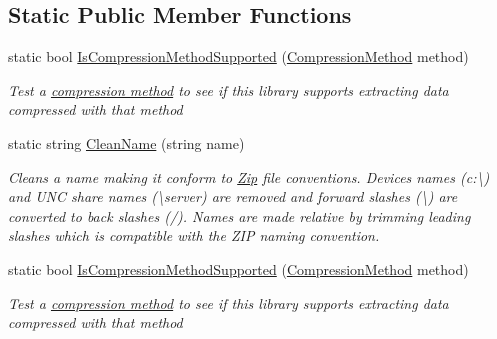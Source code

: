 \subsection*{Static Public Member Functions}
\begin{DoxyCompactItemize}
\item 
static bool \hyperlink{class_i_c_sharp_code_1_1_sharp_zip_lib_1_1_zip_1_1_zip_entry_ad464679f6e18df0d48a71dbc47fa1ac5}{Is\+Compression\+Method\+Supported} (\hyperlink{namespace_i_c_sharp_code_1_1_sharp_zip_lib_1_1_zip_a90a0e174eca72bf6b490bae40d83a09e}{Compression\+Method} method)
\begin{DoxyCompactList}\small\item\em Test a \hyperlink{class_i_c_sharp_code_1_1_sharp_zip_lib_1_1_zip_1_1_zip_entry_a1c4996433278e904adf2b5a6fe8718c0}{compression method} to see if this library supports extracting data compressed with that method \end{DoxyCompactList}\item 
static string \hyperlink{class_i_c_sharp_code_1_1_sharp_zip_lib_1_1_zip_1_1_zip_entry_a1eb0c6159ce91d0303ab617c109b6b0d}{Clean\+Name} (string name)
\begin{DoxyCompactList}\small\item\em Cleans a name making it conform to \hyperlink{namespace_i_c_sharp_code_1_1_sharp_zip_lib_1_1_zip}{Zip} file conventions. Devices names (\textquotesingle{}c\+:\textbackslash{}\textquotesingle{}) and U\+NC share names (\textquotesingle{}\textbackslash{}server\textquotesingle{}) are removed and forward slashes (\textquotesingle{}\textbackslash{}\textquotesingle{}) are converted to back slashes (\textquotesingle{}/\textquotesingle{}). Names are made relative by trimming leading slashes which is compatible with the Z\+IP naming convention. \end{DoxyCompactList}\item 
static bool \hyperlink{class_i_c_sharp_code_1_1_sharp_zip_lib_1_1_zip_1_1_zip_entry_ad464679f6e18df0d48a71dbc47fa1ac5}{Is\+Compression\+Method\+Supported} (\hyperlink{namespace_i_c_sharp_code_1_1_sharp_zip_lib_1_1_zip_a90a0e174eca72bf6b490bae40d83a09e}{Compression\+Method} method)
\begin{DoxyCompactList}\small\item\em Test a \hyperlink{class_i_c_sharp_code_1_1_sharp_zip_lib_1_1_zip_1_1_zip_entry_a1c4996433278e904adf2b5a6fe8718c0}{compression method} to see if this library supports extracting data compressed with that method \end{DoxyCompactList}\item 

\end{DoxyCompactItemize}
